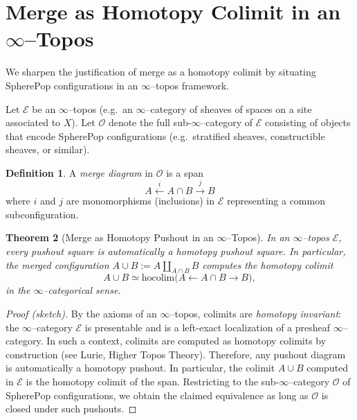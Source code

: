 \documentclass[12pt]{article}
\theoremstyle{plain}
\newtheorem{theorem}{Theorem}[section]
\theoremstyle{definition}
\newtheorem{definition}[theorem]{Definition}
\theoremstyle{remark}
\begin{document}
\section{Merge as Homotopy Colimit in an $\infty$--Topos}

We sharpen the justification of merge as a homotopy colimit by situating
SpherePop configurations in an $\infty$--topos framework.

Let $\mathcal{E}$ be an $\infty$--topos (e.g.\ an $\infty$--category of
sheaves of spaces on a site associated to $X$). Let $\mathcal{O}$ denote the
full sub-$\infty$--category of $\mathcal{E}$ consisting of objects that encode
SpherePop configurations (e.g.\ stratified sheaves, constructible sheaves, or
similar).

\begin{definition}
A \emph{merge diagram} in $\mathcal{O}$ is a span
\[
    A \xleftarrow{i} A\cap B \xrightarrow{j} B
\]
where $i$ and $j$ are monomorphisms (inclusions) in $\mathcal{E}$ representing
a common subconfiguration.
\end{definition}

\begin{theorem}[Merge as Homotopy Pushout in an $\infty$--Topos]
\label{thm:merge-hocolim-infty}
In an $\infty$--topos $\mathcal{E}$, every pushout square is automatically a
homotopy pushout square. In particular, the merged configuration
$A\cup B := A \amalg_{A\cap B} B$ computes the homotopy colimit
\[
    A\cup B \simeq
    \mathrm{hocolim}\bigl( A \leftarrow A\cap B \rightarrow B \bigr),
\]
in the $\infty$--categorical sense.
\end{theorem}

\begin{proof}[Proof (sketch)]
By the axioms of an $\infty$--topos, colimits are \emph{homotopy invariant}:
the $\infty$--category $\mathcal{E}$ is presentable and is a left-exact
localization of a presheaf $\infty$--category. In such a context, colimits
are computed as homotopy colimits by construction (see Lurie, Higher
Topos Theory). Therefore, any pushout diagram is automatically a homotopy
pushout. In particular, the colimit $A\cup B$ computed in $\mathcal{E}$ is
the homotopy colimit of the span. Restricting to the sub-$\infty$--category
$\mathcal{O}$ of SpherePop configurations, we obtain the claimed equivalence
as long as $\mathcal{O}$ is closed under such pushouts.
\end{proof}
\end{document}

